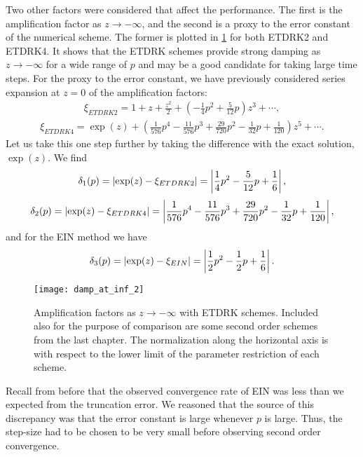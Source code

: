 Two other factors were considered that affect the performance. The first is the amplification factor as $z\to-\infty$, and the second is a proxy to the error constant of the numerical scheme. The former is plotted in \cref{fig:damp fac at inf etd} for both ETDRK2 and ETDRK4. It shows that the ETDRK schemes provide strong damping as $z\to-\infty$ for a wide range of $p$ and may be a good candidate for taking large time steps. For the proxy to the error constant, we have previously considered series expansion at $z=0$ of the amplification factors:
\begin{align}
        \xi_{ETDRK2} = 1+ z + \frac{z^2}{2} + \left(-\frac{1}{4}p^2 + \frac{5}{12}p \right) z^3 + \cdots ,
\end{align}
\begin{align}
        \xi_{ETDRK4} = \exp(z) + \left( 
\frac{1}{576}p^4 
- \frac{11}{576}p^3
+ \frac{29}{720}p^2
- \frac{1}{32}p
+ \frac{1}{120} 
\right) z^5 + \cdots .
\end{align}
Let us take this one step further by taking the difference with the exact solution, $\exp(z)$. We find 
\begin{align}
        \delta_1(p) = \left|\exp(z) - \xi_{ETDRK2}\right| 
= \left|\frac{1}{4}p^2 - \frac{5}{12}p + \frac{1}{6}\right|,
\end{align}
\begin{align}
        \delta_2(p) = \left|\exp(z) - \xi_{ETDRK4}\right| 
= \left|\frac{1}{576}p^4 
- \frac{11}{576}p^3
+ \frac{29}{720}p^2
- \frac{1}{32}p
+ \frac{1}{120} \right|,
\end{align}
and for the EIN method we have 
\begin{align}
\delta_3(p) = \left|\exp(z) - \xi_{EIN}\right| 
= \left|\frac{1}{2} p^2 - \frac{1}{2}p + \frac{1}{6}\right|.
\end{align}

\begin{figure}[htb!]
        \centering
\texttt{[image: damp\_at\_inf\_2]}
\caption[Amplification factors as $z\to-\infty$ with ETDRK schemes.]{Amplification factors as $z\to-\infty$ with ETDRK schemes. Included also for the purpose of comparison are some second order schemes from the last chapter. The normalization along the horizontal axis is with respect to the lower limit of the parameter restriction of each scheme.}
\label{fig:damp fac at inf etd}
\end{figure}

Recall from before that the observed convergence rate of EIN was less than we expected from the truncation error. We reasoned that the source of this discrepancy was that the error constant is large whenever $p$ is large. Thus, the step-size had to be chosen to be very small before observing second order convergence.

